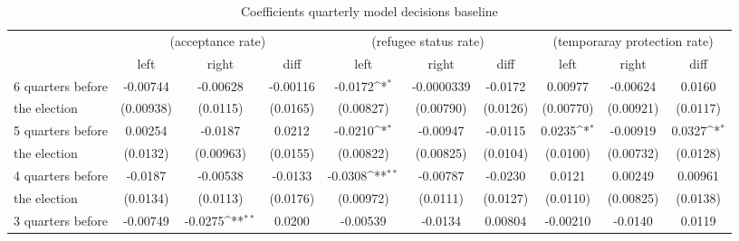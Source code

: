 \begin{table}[!ht]\centering \scriptsize
\def\sym#1{\ifmmode^{#1}\else\(^{#1}\)\fi}
\caption{Coefficients quarterly model decisions baseline}
\begin{tabular}{l*{9}{c}}
\hline\hline
                    &\multicolumn{3}{c}{(acceptance rate)}&\multicolumn{3}{c}{(refugee status rate)}&\multicolumn{3}{c}{(temporaray protection rate)}\\
&\multicolumn{1}{c}{left}&\multicolumn{1}{c}{right}&\multicolumn{1}{c}{diff}&\multicolumn{1}{c}{left}&\multicolumn{1}{c}{right}&\multicolumn{1}{c}{diff}&\multicolumn{1}{c}{left}&\multicolumn{1}{c}{right}&\multicolumn{1}{c}{diff}\\
\hline
 6 quarters before&    -0.00744         &    -0.00628         &    -0.00116         &     -0.0172\sym{*}  &  -0.0000339         &     -0.0172         &     0.00977         &    -0.00624         &      0.0160         \\
 the election                    &   (0.00938)         &    (0.0115)         &    (0.0165)         &   (0.00827)         &   (0.00790)         &    (0.0126)         &   (0.00770)         &   (0.00921)         &    (0.0117)         \\
[0.5em]
 5 quarters before&     0.00254         &     -0.0187         &      0.0212         &     -0.0210\sym{*}  &    -0.00947         &     -0.0115         &      0.0235\sym{*}  &    -0.00919         &      0.0327\sym{*}  \\
 the election                    &    (0.0132)         &   (0.00963)         &    (0.0155)         &   (0.00822)         &   (0.00825)         &    (0.0104)         &    (0.0100)         &   (0.00732)         &    (0.0128)         \\
[0.5em]
 4 quarters before&     -0.0187         &    -0.00538         &     -0.0133         &     -0.0308\sym{**} &    -0.00787         &     -0.0230         &      0.0121         &     0.00249         &     0.00961         \\
 the election                    &    (0.0134)         &    (0.0113)         &    (0.0176)         &   (0.00972)         &    (0.0111)         &    (0.0127)         &    (0.0110)         &   (0.00825)         &    (0.0138)         \\
[0.5em]
 3 quarters before &    -0.00749         &     -0.0275\sym{**} &      0.0200         &    -0.00539         &     -0.0134         &     0.00804         &    -0.00210         &     -0.0140         &      0.0119         \\

\end{tabular}
\end{table}
